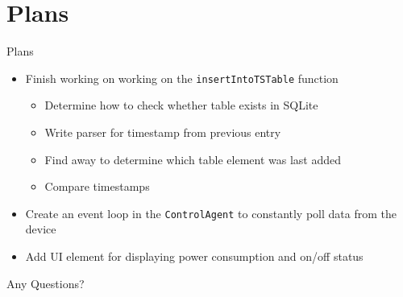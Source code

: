 \documentclass{beamer}
\begin{document}
\section{Plans}
\begin{frame}{Plans}{}
\begin{itemize}
\item Finish working on working on the \texttt{insertIntoTSTable} function
\begin{itemize}
\item Determine how to check whether table exists in SQLite
\item Write parser for timestamp from previous entry
\item Find away to determine which table element was last added
\item Compare timestamps
\end{itemize}
\item Create an event loop in the \texttt{ControlAgent} to constantly poll data from the device
\item Add UI element for displaying power consumption and on/off status
\end{itemize}
\end{frame}


\begin{frame}
\Huge
\center
Any Questions?
\end{frame}
\end{document}
